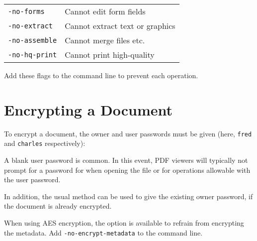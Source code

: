 \documentclass{book}
\begin{document}
   \vspace{2mm}
   \begin{tabular}{ll}
     \texttt{-no-forms} & Cannot edit form fields\\
     \texttt{-no-extract} & Cannot extract text or graphics\\
     \texttt{-no-assemble} & Cannot merge files etc.\\
     \texttt{-no-hq-print} & Cannot print high-quality\\
   \end{tabular}

  \vspace{2mm}
  \noindent Add these flags to the command line to prevent each operation.

  \vspace{2mm}

  \section{Encrypting a Document}
  To encrypt a document, the owner and user passwords must be given (here, \texttt{fred} and \texttt{charles} respectively):

\noindent{}

  \noindent A blank user password is
common. In this event, PDF viewers will typically not prompt for a
password for when opening the file or for operations allowable with the user password.

\noindent{}

\noindent In addition, the usual method can be used to give the existing owner
password, if the document is already encrypted. 

When using AES encryption, the option is available to refrain from encrypting the
metadata. Add \texttt{-no-encrypt-metadata} to the command line.
\end{document}
